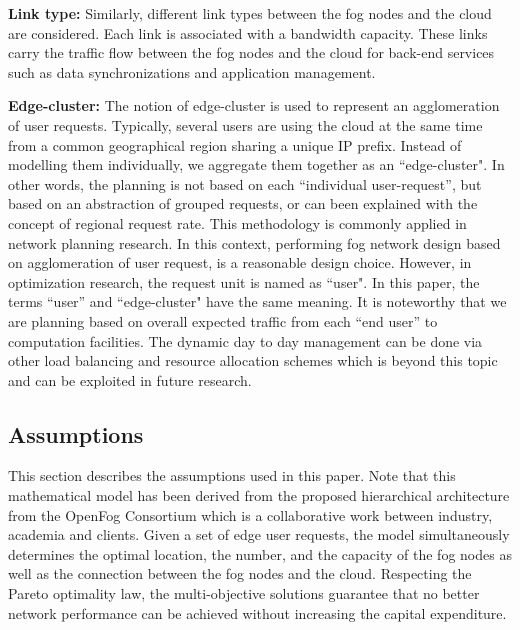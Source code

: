 \documentclass[10pt,journal,compsoc]{IEEEtran}
\begin{document}
\textbf{Link type: }Similarly, different link types between the fog nodes and the cloud are considered. Each link is associated with a bandwidth capacity. These links carry the traffic flow between the fog nodes and the cloud for back-end services such as data synchronizations and application management.

\textbf{Edge-cluster: }The notion of edge-cluster is used to represent an agglomeration of user requests. Typically, several users are using the cloud at the same time from a common geographical region sharing a unique IP prefix. Instead of modelling them individually, we aggregate them together as an ``edge-cluster". In other words, the planning is not based on each “individual user-request”, but based on an abstraction of grouped requests, or can been explained with the concept of regional request rate. This methodology is commonly applied in network planning research\cite{zhang2010cloud,wang2017computation,pahlavan2011principles}. In this context, performing fog network design based on agglomeration of user request, is a reasonable design choice. However, in optimization research, the request unit is named as ``user". In this paper, the terms ``user'' and ``edge-cluster" have the same meaning.
It is noteworthy that we are planning based on overall expected traffic from each ``end user'' to computation facilities. The dynamic day to day management can be done via other load balancing and resource allocation schemes which is beyond this topic and can be exploited in future research.



\subsection{Assumptions}\label{assumption}
This section describes the assumptions used in this paper. Note that this mathematical model has been derived from the proposed hierarchical architecture from the OpenFog Consortium which is a collaborative work between industry, academia and clients. Given a set of edge user requests, the model simultaneously determines the optimal location, the number, and the capacity of the fog nodes as well as the connection between the fog nodes and the cloud. Respecting the Pareto optimality law, the multi-objective solutions guarantee that no better network performance can be achieved without increasing the capital expenditure.
\end{document}
